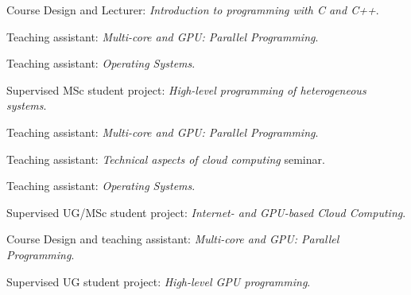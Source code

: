 \begin{cvitemize}[\small 2012 - 2013]
    \item  Course Design and Lecturer:
        \emph{Introduction to programming with C and C++}.
      \item    Teaching assistant:
        \emph{Multi-core and GPU\@: Parallel Programming}.
    \item Teaching assistant:
        \emph{Operating Systems}.
\end{cvitemize}

\begin{cvitemize}[\small 2011 - 2012]
    \item Supervised MSc student project:
        \emph{High-level programming of heterogeneous systems}.
      \item Teaching assistant:
        \emph{Multi-core and GPU\@: Parallel Programming}.
    \item Teaching assistant:
        \emph{Technical aspects of cloud computing} seminar.
      \item Teaching assistant:
        \emph{Operating Systems}.
\end{cvitemize}

\begin{cvitemize}[\small 2010 - 2011]
    \item Supervised UG/MSc student project:
        \emph{Internet- and GPU-based Cloud Computing}.
      \item Course Design and teaching assistant:
        \emph{Multi-core and GPU\@: Parallel Programming}.
    \item Supervised UG student project:
        \emph{High-level GPU programming}.
\end{cvitemize}